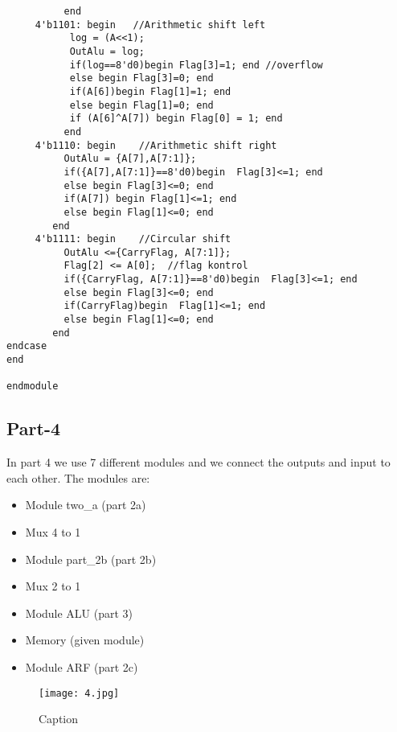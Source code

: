 \documentclass[12pt]{article}
\begin{document}
\begin{lstlisting}
          end
     4'b1101: begin   //Arithmetic shift left
           log = (A<<1);
           OutAlu = log;
           if(log==8'd0)begin Flag[3]=1; end //overflow
           else begin Flag[3]=0; end
           if(A[6])begin Flag[1]=1; end
           else begin Flag[1]=0; end
           if (A[6]^A[7]) begin Flag[0] = 1; end
          end
     4'b1110: begin    //Arithmetic shift right
          OutAlu = {A[7],A[7:1]};
          if({A[7],A[7:1]}==8'd0)begin  Flag[3]<=1; end
          else begin Flag[3]<=0; end
          if(A[7]) begin Flag[1]<=1; end
          else begin Flag[1]<=0; end
        end
     4'b1111: begin    //Circular shift 
          OutAlu <={CarryFlag, A[7:1]};
          Flag[2] <= A[0];  //flag kontrol
          if({CarryFlag, A[7:1]}==8'd0)begin  Flag[3]<=1; end
          else begin Flag[3]<=0; end
          if(CarryFlag)begin  Flag[1]<=1; end
          else begin Flag[1]<=0; end
        end       
endcase
end

endmodule
\end{lstlisting}

\clearpage

\subsection{Part-4}
In part 4 we use 7 different modules and we connect the outputs and input to each other. 
The modules are:
\begin{itemize}
    \item Module two\_a (part 2a)
    \item Mux 4 to 1
    \item Module part\_2b (part 2b)
    \item Mux 2 to 1 
    \item Module ALU (part 3)
    \item Memory (given module)
    \item Module ARF (part 2c)
\end{itemize}

\begin{figure}[H]
    \centering
    \texttt{[image: 4.jpg]}
    \caption{Caption}
    \label{fig:part4}
\end{figure}
    
\clearpage
\end{document}
